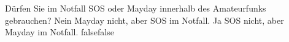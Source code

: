     {Dürfen Sie im Notfall SOS oder Mayday innerhalb des Amateurfunks gebrauchen?}
    {Nein}
    {Mayday nicht, aber SOS im Notfall.}
    {Ja}
    {SOS nicht, aber Mayday im Notfall.}
    {false}{false}